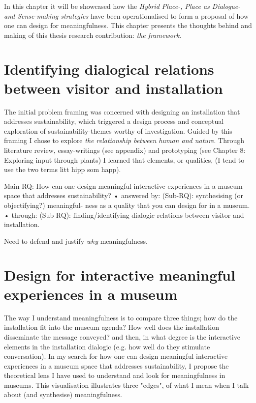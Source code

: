 In this chapter it will be showcased how the \emph{Hybrid Place-, Place as Dialogue- and Sense-making strategies} have been operationalised to form a proposal of how one can design for meaningfulness. This chapter presents the thoughts behind and making of this thesis research contribution: \emph{the framework}.

\section{Identifying dialogical relations between visitor and installation}


The initial problem framing was concerned with designing an installation that addresses sustainability, which triggered a design process and conceptual exploration of sustainability-themes worthy of investigation. Guided by this framing I chose to explore \emph{the relationship between human and nature}. Through literature review, essay-writings (see appendix) and prototyping (see Chapter 8: Exploring input through plants) I learned that elements, or qualities, (I tend to use the two terms litt hipp som happ). 




Main RQ: How can one design meaningful interactive experiences in
a museum space that addresses sustainability?
• answered by: (Sub-RQ): synthesising (or objectifying?) meaningful-
ness as a quality that you can design for in a museum.
• through: (Sub-RQ): finding/identifying dialogic relations between
visitor and installation.

Need to defend and justify \emph{why} meaningfulness. 

\section{Design for interactive meaningful experiences in a museum}

The way I understand meaningfulness is to compare three things; how do the installation fit into the museum agenda? How well does the installation disseminate the message conveyed? and then, in what degree is the interactive elements in the installation dialogic (e.g. how well do they stimulate conversation). In my search for how one can design meaningful interactive experiences in a museum space that addresses sustainability, I propose the theoretical lens I have used to understand and look for meaningfulness in museums. This visualisation illustrates three "edges", of what I mean when I talk about (and synthesise) meaningfulness. 


